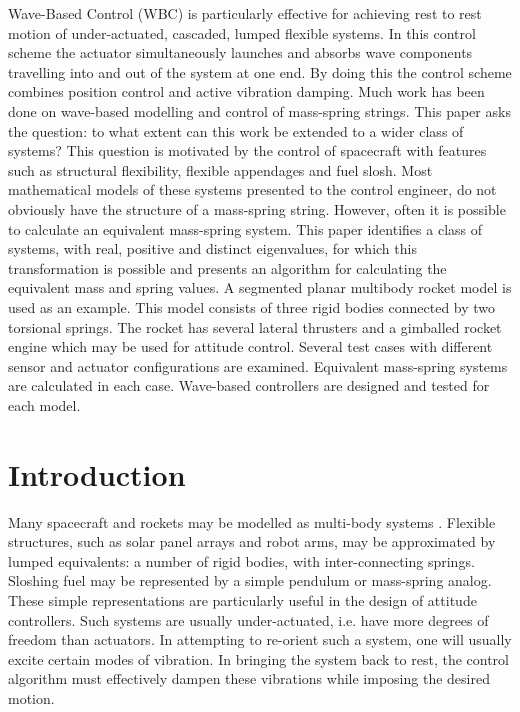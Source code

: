 \documentclass{mbd_fullpaper}
\begin{document}
Wave-Based Control (WBC) is particularly effective for achieving rest to rest motion of under-actuated, cascaded, lumped flexible systems.
In this control scheme the actuator simultaneously launches and absorbs wave components travelling into and out of the system at one end.
By doing this the control scheme combines position control and active vibration damping.
Much work has been done on wave-based modelling and control of mass-spring strings.
This paper asks the question: to what extent can this work be extended to a wider class of systems?
This question is motivated by the control of spacecraft with features such as structural flexibility, flexible appendages and fuel slosh.
Most mathematical models of these systems presented to the control engineer, do not obviously have the structure of a mass-spring string.
However, often it is possible to calculate an equivalent mass-spring system.
This paper identifies a class of systems, with real, positive and distinct eigenvalues, for which this transformation is possible and presents an algorithm for calculating the equivalent mass and spring values.
A segmented planar multibody rocket model is used as an example.
This model consists of three rigid bodies connected by two torsional springs.
The rocket has several lateral thrusters and a gimballed rocket engine which may be used for attitude control.
Several test cases with different sensor and actuator configurations are examined.
Equivalent mass-spring systems are calculated in each case.
Wave-based controllers are designed and tested for each model.


\section{Introduction}

Many spacecraft and rockets may be modelled as multi-body systems \cite{Dodge2000,Kane1980,Reyhanoglu2004}.
Flexible structures, such as solar panel arrays and robot arms, may be approximated by lumped equivalents: a number of rigid bodies, with inter-connecting springs.
Sloshing fuel may be represented by a simple pendulum or mass-spring analog.
These simple representations are particularly useful in the design of attitude controllers.
Such systems are usually under-actuated, i.e. have more degrees of freedom than actuators.
In attempting to re-orient such a system, one will usually excite certain modes of vibration.
In bringing the system back to rest, the control algorithm must effectively dampen these vibrations while imposing the desired motion.
\end{document}
